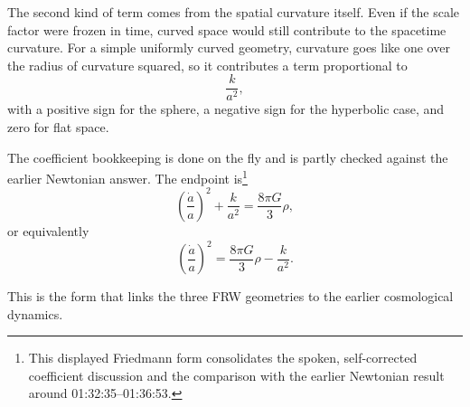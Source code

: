 The second kind of term comes from the spatial curvature itself. Even if the scale factor were frozen in time, curved space would still contribute to the spacetime curvature. For a simple uniformly curved geometry, curvature goes like one over the radius of curvature squared, so it contributes a term proportional to
\begin{equation}
\frac{k}{a^2},
\end{equation}
with a positive sign for the sphere, a negative sign for the hyperbolic case, and zero for flat space.

\begin{classroomqa}
\end{classroomqa}

The coefficient bookkeeping is done on the fly and is partly checked against the earlier Newtonian answer. The endpoint is\footnote{This displayed Friedmann form consolidates the spoken, self-corrected coefficient discussion and the comparison with the earlier Newtonian result around 01:32:35--01:36:53.}
\begin{equation}
\left(\frac{\dot a}{a}\right)^2+\frac{k}{a^2}=\frac{8\pi G}{3}\rho,
\end{equation}
or equivalently
\begin{equation}
\left(\frac{\dot a}{a}\right)^2=\frac{8\pi G}{3}\rho-\frac{k}{a^2}.
\end{equation}

This is the form that links the three FRW geometries to the earlier cosmological dynamics.

\begin{classroomqa}
\end{classroomqa}

\begin{classroomqa}
\end{classroomqa}

